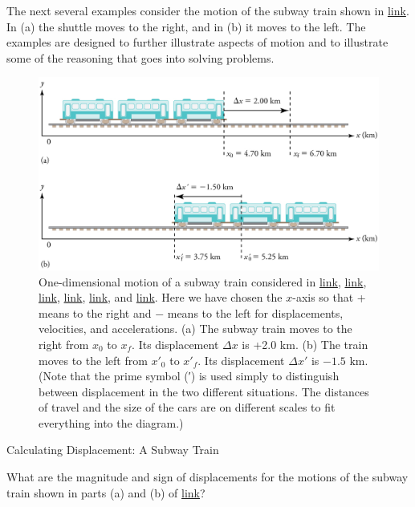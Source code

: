 \documentclass[
]{book}
\begin{document}
The next several examples consider the motion of the subway train shown
in \protect\hyperlink{import-auto-id2590556}{link}. In (a) the
shuttle moves to the right, and in (b) it moves to the left. The
examples are designed to further illustrate aspects of motion and to
illustrate some of the reasoning that goes into solving problems.

\begin{figure}
\hypertarget{import-auto-id2590556}{%
\centering
\includegraphics{images/Figure_02_03_03.jpg}
\caption{One-dimensional motion of a subway train considered in
\protect\hyperlink{fs-id1744930}{link},
\protect\hyperlink{fs-id4082275}{link},
\protect\hyperlink{fs-id1372721}{link},
\protect\hyperlink{fs-id3600466}{link},
\protect\hyperlink{fs-id1348757}{link}, and
\protect\hyperlink{fs-id4015260}{link}. Here we have chosen the
\(x{}\)-axis so that + means to the right and \(- {}\) means to the left for
displacements, velocities, and accelerations. (a) The subway train moves
to the right from \(x_{0}{}\) to \(x_{f}\). Its displacement \(\Delta x\) is
+2.0 km. (b) The train moves to the left from \({x\prime}_{0}\) to
\({x\prime}_{f}{}\). Its displacement \({\Delta x\prime}{}\) is
\({{- 1}\text{.5\ km}}{}\). (Note that the prime symbol (′) is used simply
to distinguish between displacement in the two different situations. The
distances of travel and the size of the cars are on different scales to
fit everything into the
diagram.)}\label{import-auto-id2590556}
}
\end{figure}

\hypertarget{fs-id1744930}{}
Calculating Displacement: A Subway Train

What are the magnitude and sign of displacements for the motions of the
subway train shown in parts (a) and (b) of
\protect\hyperlink{import-auto-id2590556}{link}?
\end{document}
